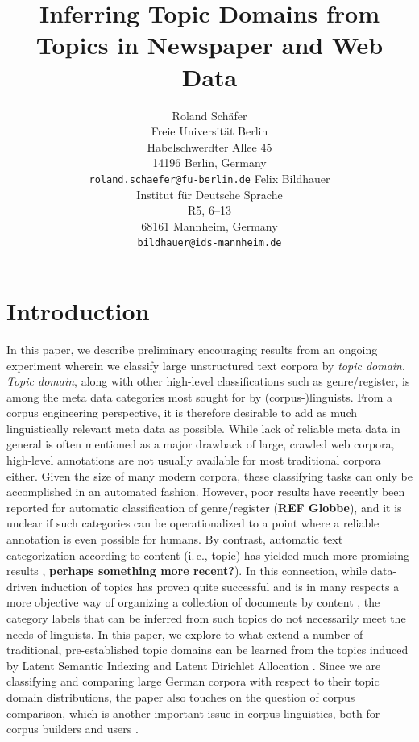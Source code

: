 \documentclass[11pt]{article}
\title{Inferring Topic Domains from Topics in Newspaper and Web Data}
\author{Roland Schäfer\\
	    Freie Universität Berlin\\
	    Habelschwerdter Allee 45\\
	    14196 Berlin, Germany\\
	    {\tt roland.schaefer@fu-berlin.de}
	  \And
	Felix Bildhauer\\
  	Institut für Deutsche Sprache\\
  	R5, 6--13\\
  	68161 Mannheim, Germany\\
  {\tt bildhauer@ids-mannheim.de}}
\date{}
\begin{document}
\maketitle

\begin{abstract}
\end{abstract}

\section{Introduction}
\label{sec:introduction}
In this paper, we describe preliminary encouraging results from an ongoing experiment wherein we classify large unstructured text corpora by \textit{topic domain}. \textit{Topic domain}, along with other high-level classifications such as genre/register, is among the meta data categories most sought for by (corpus-)\-linguists. From a corpus engineering perspective, it is therefore desirable to add as much linguistically relevant meta data as possible. While lack of reliable meta data in general is often mentioned as a major drawback of large, crawled web corpora, high-level annotations are not usually available for most traditional corpora either. Given the size of many modern corpora, these classifying tasks can only be accomplished in an automated fashion. However, poor results have recently been reported for automatic classification of genre/register (\textbf{REF Globbe}), and it is unclear if such categories can be operationalized to a point where a reliable annotation is even possible for humans. By contrast, automatic text categorization according to content (i.\,e., topic) has yielded much more promising results \cite{Sebastiani2002}, \textbf{perhaps something more recent?}). In this connection, while data-driven induction of topics has proven quite successful and is in many respects a more objective way of organizing a collection of documents by content \cite{Eagles1996}, the category labels that can be inferred from such topics do not necessarily meet the needs of linguists. In this paper, we explore to what extend a number of traditional, pre-established topic domains can be learned from the topics induced by Latent Semantic Indexing \cite{LandauerDumais1994,LandauerDumais1997} and Latent Dirichlet Allocation \cite{BleiEa2003}. Since we are classifying and comparing large German corpora with respect to their topic domain distributions, the paper also touches on the question of corpus comparison, which is another important issue in corpus linguistics, both for corpus builders and users    \cite{Kilgarriff2001,BiemannEa2013,SchaeferBildhauer2013de}.
\end{document}
